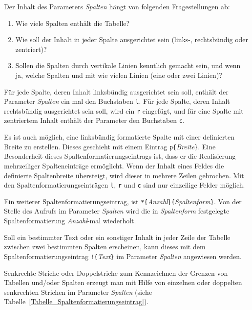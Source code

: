 \documentclass[a4paper,10pt,twoside]{scrbook}
\begin{document}
Der Inhalt des Parameters \textsl{Spalten} hängt von 
folgenden Fragestellungen ab:

\begin{enumerate}
\item Wie viele Spalten enthält die Tabelle?
\item Wie soll der Inhalt in jeder Spalte ausgerichtet sein (links-,
rechtsbündig oder zentriert)?
\item Sollen die Spalten durch vertikale Linien kenntlich gemacht sein, und
wenn ja, welche Spalten und mit wie vielen Linien (eine oder zwei Linien)?
\end{enumerate}



Für jede Spalte, deren Inhalt 
linksbündig ausgerichtet sein soll,
enthält der Parameter \textsl{Spalten} ein mal den Buchstaben \verb!l!. 
Für jede Spalte, deren Inhalt rechtsbündig
ausgerichtet sein soll, wird ein \verb!r! eingefügt, und für eine Spalte
mit zentriertem Inhalt 
enthält der Parameter den Buchstaben \verb!c!.

Es ist auch möglich, eine linksbündig formatierte Spalte mit einer 
definierten Breite zu erstellen. Dieses geschieht mit einem Eintrag
\verb!p{!\textsl{Breite}\verb!}!. Eine Besonderheit dieses 
Spaltenformatierungseintrags ist, dass er die Realisierung mehrzeiliger
Spalteneinträge ermöglicht. Wenn der Inhalt eines Feldes die  
definierte Spaltenbreite übersteigt, wird dieser in mehrere Zeilen gebrochen.
Mit den Spaltenformatierungseinträgen \verb!l!, \verb!r! und \verb!c! 
sind nur einzeilige Felder möglich.

Ein weiterer Spaltenformatierungseintrag,
ist \verb!*{!\textsl{Anzahl}\verb!}{!\textsl{Spaltenform}\verb!}!.
Von der Stelle des Aufrufs im Parameter \textsl{Spalten}
wird die in \textsl{Spaltenform} festgelegte Spaltenformatierung
\textsl{Anzahl}-mal wiederholt.

Soll ein bestimmter Text oder ein sonstiger Inhalt in jeder 
Zeile der Tabelle zwischen zwei bestimmten Spalten erscheinen, kann dieses
mit dem Spaltenformatierungseintrag \texttt{!\{}\textsl{Text}\texttt{\}}
im Parameter \textsl{Spalten} angewiesen werden.


Senkrechte Striche oder Doppelstriche zum Kennzeichnen der 
Grenzen von Tabellen und/oder Spalten erzeugt man mit 
Hilfe von einzelnen oder doppelten 
senkrechten Strichen im Parameter \textsl{Spalten} 
(siehe Tabelle~\ref{Tabelle_Spaltenformatierungseintrag}).
\end{document}
